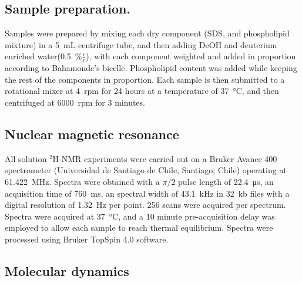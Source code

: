 \documentclass[3p,preprint,review]{elsarticle}
\begin{document}
	\subsection{Sample preparation.}
	Samples were prepared by mixing each dry component (SDS,  and
	phospholipid mixture) in a \SI{5}{mL} centrifuge tube, and then adding DeOH and
	deuterium enriched water(\SI{0.5}{\percent}$\tfrac{v}{v}$), with each
	component
	weighted and added in proportion according to Bahamonde's
	bicelle\cite{Bahamonde-Padilla2013}. Phospholipid content was added while
	keeping the rest of the components in
	proportion. Each sample is then submitted to a
	rotational mixer at \SI{4}{rpm} for 24 hours at a temperature of
	\SI{37}{\celsius}, and then centrifuged at \SI{6000}{rpm} for 3 minutes.
	
	
	\subsection{Nuclear magnetic resonance}
	\label{sec:method_nmr}
	All solution $^2$H-NMR experiments were carried out on a Bruker Avance 400
	spectrometer (Universidad de Santiago de Chile, Santiago, Chile) operating at
	\SI{61.422}{MHz}. Spectra were obtained with a $\pi/2$ pulse length of
	\SI{22.4}{\micro\second}, an acquisition time of \SI{760}{ms}, an spectral
	width of \SI{43.1}{kHz} in \SI{32}{kb} files with a digital resolution of
	\SI{1.32}{Hz} per point.
	256 scans were acquired per spectrum. Spectra
	were acquired at \SI{37}{\celsius}, and a 10 minute pre-acquisition delay was
	employed to allow each sample to reach thermal equilibrium. Spectra were
	processed
	using Bruker TopSpin 4.0 software.
	
	\subsection{Molecular dynamics}
	
\end{document}
